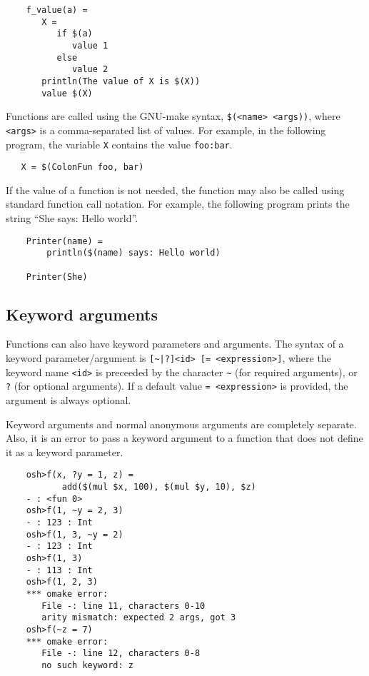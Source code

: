 \begin{verbatim}
    f_value(a) =
       X =
          if $(a)
             value 1
          else
             value 2
       println(The value of X is $(X))
       value $(X)
\end{verbatim}

Functions are called using the GNU-make syntax, \verb+$(<name> <args))+,
where \verb+<args>+ is a comma-separated list of values.  For example,
in the following program, the variable \verb+X+ contains the
value \verb+foo:bar+.

\begin{verbatim}
   X = $(ColonFun foo, bar)
\end{verbatim}

If the value of a function is not needed, the function may also be called
using standard function call notation.  For example, the following program
prints the string ``She says: Hello world''.

\begin{verbatim}
    Printer(name) =
        println($(name) says: Hello world)

    Printer(She)
\end{verbatim}

\subsection{Keyword arguments}
\label{section:keyword-arguments}

\newinkeyword

Functions can also have keyword parameters and arguments.  The syntax of a keyword
parameter/argument is \verb+[~|?]<id> [= <expression>]+, where the keyword name \verb+<id>+
is preceeded by the character \verb+~+ (for required arguments), or \verb+?+ (for optional
arguments).  If a default value \verb+= <expression>+ is provided, the argument is
always optional.

Keyword arguments and normal anonymous arguments are completely separate.  Also, it is an error to
pass a keyword argument to a function that does not define it as a keyword parameter.

\begin{verbatim}
    osh>f(x, ?y = 1, z) =
           add($(mul $x, 100), $(mul $y, 10), $z)
    - : <fun 0>
    osh>f(1, ~y = 2, 3)
    - : 123 : Int
    osh>f(1, 3, ~y = 2)
    - : 123 : Int
    osh>f(1, 3)
    - : 113 : Int
    osh>f(1, 2, 3)
    *** omake error:
       File -: line 11, characters 0-10
       arity mismatch: expected 2 args, got 3
    osh>f(~z = 7)
    *** omake error:
       File -: line 12, characters 0-8
       no such keyword: z
\end{verbatim}

